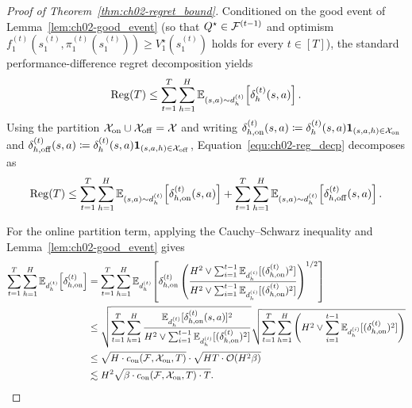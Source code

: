\begin{proof}[Proof of Theorem~\ref{thm:ch02-regret_bound}]
Conditioned on the good event of Lemma~\ref{lem:ch02-good_event} (so that $Q^\star \in {\mathcal{F}}^{(t-1)}$ and optimism $f_1^{(t)}(s_1^{(t)}, \pi_1^{(t)}(s_1^{(t)})) \geq V_1^\star(s_1^{(t)})$ holds for every $t \in [T]$), the standard performance-difference regret decomposition \citep[Lemma 3]{xie2022role} yields
\begin{equation}
    \operatorname{Reg}(T) \leq \sum_{t = 1}^T \sum_{h=1}^H \mathbb{E}_{(s, a) \sim d_h^{(t)}} \!\left[\delta_h^{(t)}(s, a)\right]. \label{equ:ch02-reg_decp}
\end{equation}
Using the partition ${\mathcal{X}}_{{\operatorname{on}}} \cup {\mathcal{X}}_{{\operatorname{off}}} = {\mathcal{X}}$ and writing $\delta_{h, {\operatorname{on}}}^{(t)}(s, a) \coloneqq \delta_{h}^{(t)}(s, a) \mathbf{1}_{(s, a, h) \in {\mathcal{X}}_{{\operatorname{on}}}}$ and $\delta_{h, {\operatorname{off}}}^{(t)}(s, a) \coloneqq \delta_{h}^{(t)}(s, a) \mathbf{1}_{(s, a, h) \in {\mathcal{X}}_{{\operatorname{off}}}}$, Equation~\eqref{equ:ch02-reg_decp} decomposes as
\begin{equation}
    \operatorname{Reg}(T) \leq \sum_{t = 1}^T \sum_{h=1}^H \mathbb{E}_{(s, a) \sim d_h^{(t)}} \!\left[\delta_{h, {\operatorname{on}}}^{(t)}(s, a)\right] + \sum_{t = 1}^T \sum_{h=1}^H \mathbb{E}_{(s, a) \sim d_h^{(t)}} \!\left[\delta_{h, {\operatorname{off}}}^{(t)}(s, a)\right].
\end{equation}

For the online partition term, applying the Cauchy--Schwarz inequality and Lemma~\ref{lem:ch02-good_event} gives
\begin{align}
    \sum_{t = 1}^T \sum_{h=1}^H \mathbb{E}_{d_h^{(t)}} \!\left[\delta_{h, {\operatorname{on}}}^{(t)}\right]
    &= \sum_{t = 1}^T \sum_{h=1}^H \mathbb{E}_{d_h^{(t)}} \!\left[\delta_{h, {\operatorname{on}}}^{(t)} \left(\frac{H^2 \vee \sum_{i=1}^{t-1}\mathbb{E}_{d_h^{(i)}}[(\delta_{h, {\operatorname{on}}}^{(t)})^2]}{H^2 \vee \sum_{i=1}^{t-1}\mathbb{E}_{d_h^{(i)}}[(\delta_{h, {\operatorname{on}}}^{(t)})^2]}\right)^{1 / 2} \right] \nonumber\\
    &\leq \sqrt{\sum_{t = 1}^T \sum_{h=1}^H \frac{\mathbb{E}_{d_h^{(t)}}[\delta_{h, {\operatorname{on}}}^{(t)}(s, a)]^2}{H^2 \vee \sum_{i=1}^{t-1}\mathbb{E}_{d_h^{(i)}}[(\delta_{h, {\operatorname{on}}}^{(t)})^2]} } 
    \sqrt{\sum_{t = 1}^T \sum_{h=1}^H\left(H^2 \vee \sum_{i=1}^{t-1}\mathbb{E}_{d_h^{(i)}}[(\delta_{h, {\operatorname{on}}}^{(t)})^2]\right)} \nonumber\\
    &\leq \sqrt{H \cdot c_{{\operatorname{on}}}({\mathcal{F}}, {\mathcal{X}}_{{\operatorname{on}}}, T)} \cdot \sqrt{HT \cdot {\mathcal{O}}(H^2\beta)} \nonumber\\
    &\lesssim H^2\sqrt{\beta \cdot c_{{\operatorname{on}}}({\mathcal{F}}, {\mathcal{X}}_{{\operatorname{on}}}, T) \cdot T}.
\end{align}


\end{proof}
